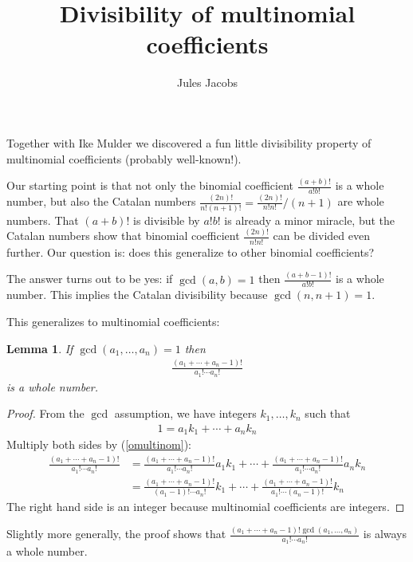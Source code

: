 

\newcommand{\tac}[1]{\lstinline[mathescape]~#1~}
\newcommand{\ciff}{\ \leftrightarrow\ }
\newcommand{\hyp}{\tac{H}}
\newcommand{\hypB}{\tac{G}}
\newcommand{\var}{\tac{x}}
\newcommand{\varB}{\tac{y}}

\newtheorem*{nlemma}{Lemma}


\title{Divisibility of multinomial coefficients}
\author{Jules Jacobs}


\maketitle
Together with Ike Mulder we discovered a fun little divisibility property of multinomial coefficients (probably well-known!).

Our starting point is that not only the binomial coefficient $\frac{(a+b)!}{a! b!}$ is a whole number,
but also the Catalan numbers $\frac{(2n)!}{n! (n+1)!} = \frac{(2n)!}{n!n!} / (n+1)$ are whole numbers.
That $(a+b)!$ is divisible by $a! b!$ is already a minor miracle, but the Catalan numbers show that binomial coefficient $\frac{(2n)!}{n!n!}$ can be divided even further. Our question is: does this generalize to other binomial coefficients?

The answer turns out to be yes: if $\gcd(a, b) = 1$ then $\frac {(a + b - 1)!}{a! b!}$ is a whole number.
This implies the Catalan divisibility because $\gcd(n,n+1) = 1$.

This generalizes to multinomial coefficients:

\begin{nlemma}
  If $\gcd(a_1, \dots, a_n) = 1$ then
  \begin{align}
    \label{omultinom}
    \frac
      {(a_1 + \cdots + a_n - 1)!}
      {a_1! \cdots a_n!}
  \end{align}
  is a whole number.
\end{nlemma}
\begin{proof}
  From the $\gcd$ assumption, we have integers $k_1,\dots,k_n$ such that
  \begin{align*}
    1 = a_1 k_1 + \cdots + a_n k_n
  \end{align*}
  Multiply both sides by (\ref{omultinom}):
  \begin{align*}
    \frac
      {(a_1 + \cdots + a_n - 1)!}
      {a_1! \cdots a_n!} &=
        \frac
          {(a_1 + \cdots + a_n - 1)!}
          {a_1! \cdots a_n!} a_1 k_1
        + \cdots +
        \frac
          {(a_1 + \cdots + a_n - 1)!}
          {a_1! \cdots a_n!} a_n k_n \\
      &=
      \frac
          {(a_1 + \cdots + a_n - 1)!}
          {(a_1 - 1)! \cdots a_n!} k_1
        + \cdots +
        \frac
          {(a_1 + \cdots + a_n - 1)!}
          {a_1! \cdots (a_n - 1)!} k_n
  \end{align*}
  The right hand side is an integer because multinomial coefficients are integers.
\end{proof}

Slightly more generally, the proof shows that
  $\frac
    {(a_1 + \cdots + a_n - 1)! \gcd(a_1, \dots, a_n)}
    {a_1! \cdots a_n!}$
is always a whole number.
